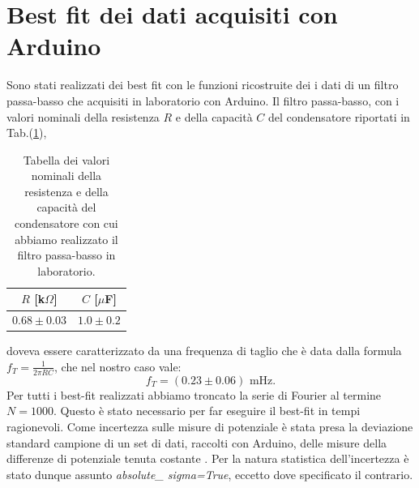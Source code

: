 \documentclass{article}
\begin{document}
\section{Best fit dei dati acquisiti con Arduino}
    Sono stati realizzati dei best fit con le funzioni ricostruite
    dei i dati di un filtro passa-basso che acquisiti
    in laboratorio con Arduino. 
    Il filtro passa-basso, con i valori nominali della resistenza $R$ e della capacità $C$ del
    condensatore riportati in Tab.(\ref{tab:val_nom}),
    \begin{table}[htbp]
        \centering
        \begin{tabular}{c c}
            \hline
            $R$ [k$\Omega$] & $C$ [$\mu$F] \\
            \hline
            $0.68 \pm 0.03$ & $1.0 \pm 0.2$ \\
            \hline
        \end{tabular}
        \caption{Tabella dei valori nominali della resistenza e della capacità del condensatore con cui abbiamo realizzato il filtro passa-basso in laboratorio.}
        \label{tab:val_nom}
    \end{table}
    doveva essere caratterizzato da una frequenza di taglio che è
     data dalla formula $f_T = \frac{1}{2 \pi RC}$, che nel nostro caso vale:
    $$
    f_T = (0.23 \pm 0.06) \text{ mHz}.
    $$
    Per tutti i best-fit realizzati abbiamo troncato la serie di Fourier al termine $N=1000$. Questo è stato necessario per far eseguire il 
    best-fit in tempi ragionevoli.
    Come incertezza sulle misure di potenziale è stata
    presa la deviazione standard campione di un set di dati, raccolti con Arduino, delle misure
    della differenze di potenziale tenuta costante \cite{Antonacci_Sermi2024}.
    Per la natura statistica dell'incertezza è stato dunque assunto \emph{absolute\_ sigma=True},
    eccetto dove specificato il contrario.
\end{document}
